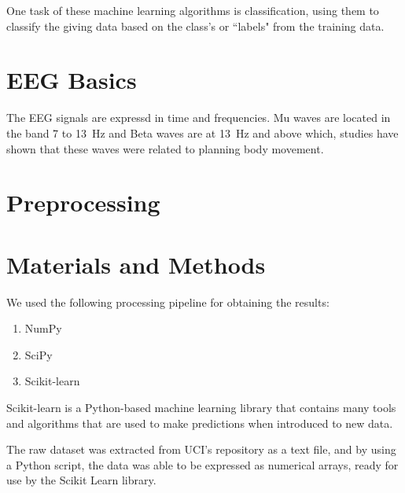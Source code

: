 \documentclass[conference,compsoc]{IEEEtran}
\begin{document}
One task of these machine learning algorithms is classification, using them to classify the giving data based on the class's or ``labels" from the training data. 
\section{EEG Basics}
The EEG signals are expressd in time and frequencies.  Mu waves are located in the band 7 to \SI{13}{\hertz} and Beta waves are at \SI{13}{\hertz} and above \cite{classsvm} which, studies have shown that these waves were related to planning body movement.
\section{Preprocessing}


\section{Materials and Methods}
We used the following processing pipeline for obtaining the results:
\begin{enumerate}
\item NumPy
\item SciPy
\item Scikit-learn
\end{enumerate}

Scikit-learn  is a Python-based machine learning library that contains many tools and algorithms that are used to make predictions when introduced to new data. 

The raw dataset was extracted from UCI's repository as a text file, and by using a Python script, the data was able to be expressed as numerical arrays, ready for use by the Scikit Learn library. %
\end{document}
